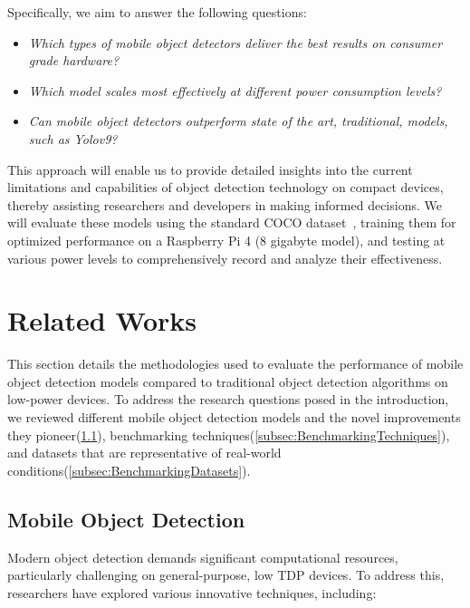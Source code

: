 \documentclass[10pt,twocolumn,letterpaper]{article}
\begin{document}
Specifically, we aim to answer the following questions:
\begin{itemize}
    \item \textit{Which types of mobile object detectors deliver the best results on consumer grade hardware? }
    \item \textit{Which model scales most effectively at different power consumption levels?}
    \item \textit{Can mobile object detectors outperform state of the art, traditional, models, such as Yolov9?}
\end{itemize}

This approach will enable us to provide detailed insights into the current limitations and capabilities of object detection technology on compact devices, thereby assisting researchers and developers in making informed decisions. We will evaluate these models using the standard COCO dataset~\cite{lin2015microsoft}, training them for optimized performance on a Raspberry Pi 4 (8 gigabyte model), and testing at various power levels to comprehensively record and analyze their effectiveness.


\section{Related Works}
\label{sec:RelatedWorks}

This section details the methodologies used to evaluate the performance of mobile object detection models compared to traditional object detection algorithms on low-power devices. To address the research questions posed in the introduction, we reviewed different mobile object detection models and the novel improvements they pioneer(\ref{subsec:MobileObjectDetection}), benchmarking techniques(\ref{subsec:BenchmarkingTechniques}), and datasets that are representative of real-world conditions(\ref{subsec:BenchmarkingDatasets}).

\subsection{Mobile Object Detection}
\label{subsec:MobileObjectDetection}
Modern object detection demands significant computational resources, particularly challenging on general-purpose, low TDP devices. To address this, researchers have explored various innovative techniques, including:
\end{document}
